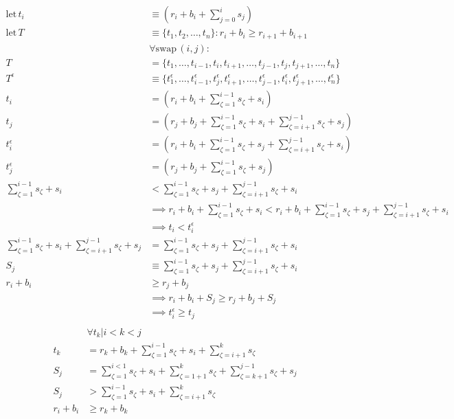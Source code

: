 \documentclass[11pt]{article}
\begin{document}
\begin{enumerate}[1.]
\begin{align*}
\mathrm{let\,}t_i&\equiv\left(r_i+b_i+\sum_{j=0}^is_j\right)\\
\mathrm{let\,}T&\equiv\{t_1,t_2,\ldots,t_n\}:r_i+b_i\ge r_{i+1}+b_{i+1}\\
&\forall\mathrm{swap\,}(i,j):\\
T&=\{t_1,\ldots,t_{i-1},t_i,t_{i+1},\ldots,t_{j-1},t_j,t_{j+1},\ldots,t_n\}\\
T^\epsilon&\equiv\{t_1^\epsilon,\ldots,t_{i-1}^\epsilon,t_j^\epsilon,t_{i+1}^\epsilon,\ldots,t_{j-1}^\epsilon,t_i^\epsilon,t_{j+1}^\epsilon,\ldots,t_n^\epsilon\}\\
t_i&=\left(r_i+b_i+\sum_{\zeta=1}^{i-1}s_\zeta+s_i\right)\\
t_j&=\left(r_j+b_j+\sum_{\zeta=1}^{i-1}s_\zeta+s_i+\sum_{\zeta=i+1}^{j-1}s_\zeta+s_j\right)\\
t_i^\epsilon&=\left(r_i+b_i+\sum_{\zeta=1}^{i-1}s_\zeta+s_j+\sum_{\zeta=i+1}^{j-1}s_\zeta+s_i\right)\\
t_j^\epsilon&=\left(r_j+b_j+\sum_{\zeta=1}^{i-1}s_\zeta+s_j\right)\\
 \sum_{\zeta=1}^{i-1}s_\zeta+s_i&<\sum_{\zeta=1}^{i-1}s_\zeta+s_j+\sum_{\zeta=i+1}^{j-1}s_\zeta+s_i\\
&\implies r_i+b_i+\sum_{\zeta=1}^{i-1}s_\zeta+s_i<r_i+b_i+\sum_{\zeta=1}^{i-1}s_\zeta+s_j+\sum_{\zeta=i+1}^{j-1}s_\zeta+s_i\\
&\implies t_i<t_i^\epsilon\\
\sum_{\zeta=1}^{i-1}s_\zeta+s_i+\sum_{\zeta=i+1}^{j-1}s_\zeta+s_j&=\sum_{\zeta=1}^{i-1}s_\zeta+s_j+\sum_{\zeta=i+1}^{j-1}s_\zeta+s_i\\
S_j&\equiv\sum_{\zeta=1}^{i-1}s_\zeta+s_j+\sum_{\zeta=i+1}^{j-1}s_\zeta+s_i\\
r_i+b_i&\ge r_j+b_j\\
&\implies r_i+b_i+S_j\ge r_j+b_j+S_j\\
&\implies t_i^\epsilon\ge t_j\\
\end{align*}
\begin{align*}
&\forall t_k|i<k<j\\
 t_k&=r_k+b_k+\sum_{\zeta=1}^{i-1}s_\zeta+s_i+\sum_{\zeta=i+1}^ks_\zeta\\
S_j&=\sum_{\zeta=1}^{i<1}s_\zeta+s_i+\sum_{\zeta=1+1}^ks_\zeta+\sum_{\zeta=k+1}^{j-1}s_\zeta+s_j\\
S_j&>\sum_{\zeta=1}^{i-1}s_\zeta+s_i+\sum_{\zeta=i+1}^ks_\zeta\\
r_i+b_i&\ge r_k+b_k\\

\end{align*}
\end{enumerate}
\end{document}
